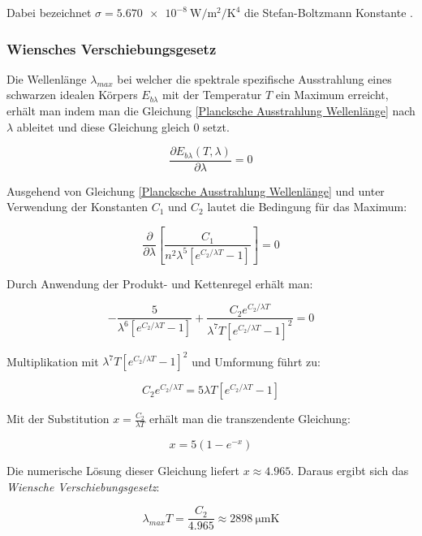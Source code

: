 \documentclass[12pt,a4paper]{article}
\begin{document}
Dabei bezeichnet $\sigma = \SI{5.670e-8}{\watt\per\meter\squared\per\kelvin\tothe{4}}$ 
die Stefan-Boltzmann Konstante \cite{codata2018}.

\iffalse
\subsubsection{Wiensches Verschiebungsgesetz}
Die Wellenlänge $\lambda_{max}$ bei welcher die spektrale spezifische Ausstrahlung eines schwarzen idealen Körpers $E_{b\lambda}$ 
mit der Temperatur $T$ ein Maximum erreicht, erhält man indem man die Gleichung \eqref{Plancksche Ausstrahlung Wellenlänge} nach 
$\lambda$ ableitet und diese Gleichung gleich $0$ setzt.

\begin{equation}
  \frac{\partial E_{b\lambda}(T, \lambda)}{\partial \lambda} = 0
\end{equation}

Ausgehend von Gleichung \eqref{Plancksche Ausstrahlung Wellenlänge} und unter Verwendung der Konstanten $C_1$ und $C_2$ 
lautet die Bedingung für das Maximum:

\begin{equation}
  \frac{\partial}{\partial \lambda}\left[\frac{C_1}{n^2\lambda^5[e^{C_2/\lambda T}-1]}\right] = 0
\end{equation}

Durch Anwendung der Produkt- und Kettenregel erhält man:

\begin{equation}
  -\frac{5}{\lambda^6[e^{C_2/\lambda T}-1]} + \frac{C_2 e^{C_2/\lambda T}}{\lambda^7 T[e^{C_2/\lambda T}-1]^2} = 0
\end{equation}

Multiplikation mit $\lambda^7 T [e^{C_2/\lambda T}-1]^2$ und Umformung führt zu:

\begin{equation}
  C_2 e^{C_2/\lambda T} = 5\lambda T[e^{C_2/\lambda T}-1]
\end{equation}

Mit der Substitution $x = \frac{C_2}{\lambda T}$ erhält man die transzendente Gleichung:

\begin{equation}
  x = 5(1 - e^{-x})
\end{equation}

Die numerische Lösung dieser Gleichung liefert $x \approx 4.965$. Daraus ergibt sich das \textit{Wiensche Verschiebungsgesetz}:

\begin{equation}
  \lambda_{max} T = \frac{C_2}{4.965} \approx \SI{2898}{\micro\meter\kelvin}
\end{equation}
\end{document}
